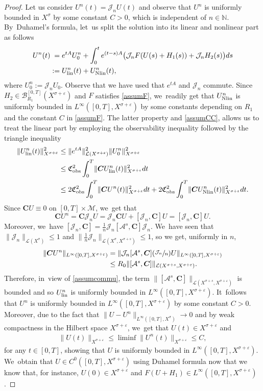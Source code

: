 \documentclass[10pt]{amsart}
\newcommand{\Psfrac}[2]{(\sfrac{#1}{#2})}
\newcommand{\lin}{\textup{lin}}
\newcommand{\Nlin}{\textup{Nlin}}
\theoremstyle{definition}
\let\mc\mathcal
\let\veps\varepsilon
\newcommand{\A}{\mc{A}}
\newcommand{\B}{\mc{B}}
\newcommand{\J}{\mc{J}}
\newcommand{\M}{\mc{M}}
\newcommand{\N}{\mathbb{N}}
\newcommand{\bC}{\boldsymbol{C}}
\providecommand{\norm}[1]{\lVert#1\rVert}
\begin{document}
\begin{proof}
Let us consider $U^n(t)=\J_nU(t)$ and observe that $U^n$ is uniformly bounded in $X^\sigma$ by some constant $C>0$, which is independent of $n\in \N$. By~Duhamel's formula, let~us split the solution into its linear and nonlinear part as follows
\begin{align*}
U^n(t)&\hphantom{:}=e^{tA}U_0^n+\int_0^t e^{(t-s)A}\big(\J_nF(U(s)+H_1(s))+\J_nH_2(s)\big)ds\\ &:=U_{\lin}^n(t)+U_{\Nlin}^n(t),
\end{align*}
where $U_0^n:=\J_n U_0$. Observe that we have used that $e^{tA}$ and $\J_n$ commute. Since \hbox{$H_2\in \B_{R_{1}}^{[0, T]}(X^{\sigma+\veps})$} and $F$ satisfies \cref{assumF}, we~readily get that $U_{\Nlin}^n$ is uniformly bounded in $L^\infty([0, T], X^{\sigma+\veps})$ by some constants depending on $R_{1}$ and the constant $C$ in \cref{assumF}. The latter property and \cref{assumCC}, allows us to treat the linear part by employing the observability inequality followed by the triangle inequality
\begin{align*}
\norm{U_{\lin}^n(t)}_{X^{\sigma+\veps}}^2&\leq \norm{e^{tA}}_{\mc{L}(X^{\sigma+\veps})}^2 \norm{U_0^n}_{X^{\sigma+\veps}}^2\\
&\leq \mathfrak{C}_{\textup{obs}}^2\int_0^T \norm{\bC U_{\lin}^n(t)}_{X^{\sigma+\veps}}^2dt\\
&\leq 2\mathfrak{C}_{\textup{obs}}^2\int_0^T \norm{\bC U^n(t)}_{X^{\sigma+\veps}}^2dt+2\mathfrak{C}_{\textup{obs}}^2\int_0^T \norm{\bC U_{\Nlin}^n(t)}_{X^{\sigma+\veps}}^2dt.
\end{align*}
Since $\bC U\equiv 0$ on $[0, T]\times \M$, we~get that
\[
\bC U^n=\bC\mc{J}_n U=\mc{J}_n\bC U+[\mc{J}_n,\bC]U=[\mc{J}_n,\bC]U.
\]
Moreover, we~have $[\mc{J}_n,\bC]=\frac{1}{n}\mc{J}_n[\A^s,\bC]\mc{J}_n$. We~have seen that $\norm{\mc{J}_n}_{\mc{L}(X^\sigma)}\leq 1$ and $\norm{\frac{1}{n}\mc{J}_n}_{\mc{L}(X^{\sigma}, X^{\sigma+s})}\leq 1$, so we get, uniformly in $n$,
\begin{align*}
\norm{\bC U^n}_{L^\infty([0, T], X^{\sigma+\veps})}&=\norm{\mc{J}_n[\A^s,\bC]\Psfrac{\mc{J}_n}{n} U}_{L^\infty([0, T], X^{\sigma+\veps})}\\
&\leq R_0\norm{[\A^s,\bC]}_{\mc{L}(X^{\sigma+s}, X^{\sigma+\veps})}.
\end{align*}
Therefore, in~view of \cref{assumcommu}, the term $\norm{[\A^s,\bC]}_{\mc{L}(X^{\sigma+s}, X^{\sigma+\veps})}$ is bounded and so $U_{\lin}^n$ is uniformly bounded in $L^\infty([0, T], X^{\sigma+\veps})$. It~follows that $U^n$ is uniformly bounded in $L^\infty([0, T], X^{\sigma+\veps})$ by some constant $C>0$. Moreover, due to the fact that $\norm{U-U^n}_{L^\infty([0, T], X^\sigma)}\to 0$ and by weak compactness in the Hilbert space $X^{\sigma+\veps}$, we~get that $U(t)\in X^{\sigma+\veps}$ and
\begin{align*}
\norm{U(t)}_{X^{\sigma+\veps}}\leq \liminf \norm{U^n(t)}_{X^{\sigma+\veps}}\leq C,
\end{align*}
for any $t\in [0, T]$, showing that $U$ is uniformly bounded in $L^\infty([0, T], X^{\sigma+\veps})$. We~obtain that $U\in C^0([0, T], X^{\sigma+\veps})$ using Duhamel formula now that we know that, for instance, $U(0)\in X^{\sigma+\veps}$ and $F(U+H_1)\in L^\infty([0, T], X^{\sigma+\veps})$.
\end{proof}
\end{document}

